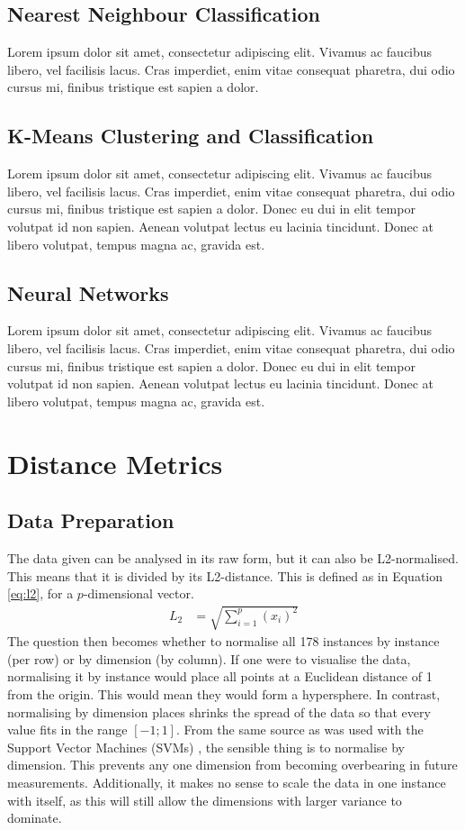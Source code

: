 \documentclass[a4paper, 10pt, conference]{ieeeconf}
\begin{document}
\subsection{Nearest Neighbour Classification}
Lorem ipsum dolor sit amet, consectetur adipiscing elit. Vivamus ac faucibus libero, vel facilisis lacus. Cras imperdiet, enim vitae consequat pharetra, dui odio cursus mi, finibus tristique est sapien a dolor.
\subsection{K-Means Clustering and Classification}
Lorem ipsum dolor sit amet, consectetur adipiscing elit. Vivamus ac faucibus libero, vel facilisis lacus. Cras imperdiet, enim vitae consequat pharetra, dui odio cursus mi, finibus tristique est sapien a dolor. Donec eu dui in elit tempor volutpat id non sapien. Aenean volutpat lectus eu lacinia tincidunt. Donec at libero volutpat, tempus magna ac, gravida est.
\subsection{Neural Networks}
Lorem ipsum dolor sit amet, consectetur adipiscing elit. Vivamus ac faucibus libero, vel facilisis lacus. Cras imperdiet, enim vitae consequat pharetra, dui odio cursus mi, finibus tristique est sapien a dolor. Donec eu dui in elit tempor volutpat id non sapien. Aenean volutpat lectus eu lacinia tincidunt. Donec at libero volutpat, tempus magna ac, gravida est.

\section{Distance Metrics}
\subsection{Data Preparation}
The data given can be analysed in its raw form, but it can also be L2-normalised. This means that it is divided by its L2-distance. This is defined as in Equation \ref{eq:l2}, for a $p$-dimensional vector.
\begin{align}
  L_2 &= \sqrt{\sum_{i = 1}^{p} \left( x_i \right) ^2 }\label{eq:l2}
\end{align}
The question then becomes whether to normalise all 178 instances by instance (per row) or by dimension (by column). If one were to visualise the data, normalising it by instance would place all points at a Euclidean distance of 1 from the origin. This would mean they would form a hypersphere. In contrast, normalising by dimension places shrinks the spread of the data so that every value fits in the range $[-1; 1]$. From the same source as was used with the Support Vector Machines (SVMs) \cite{scale}, the sensible thing is to normalise by dimension. This prevents any one dimension from becoming overbearing in future measurements. Additionally, it makes no sense to scale the data in one instance with itself, as this will still allow the dimensions with larger variance to dominate.
\end{document}
